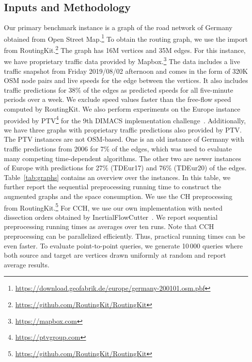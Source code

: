 \documentclass[manuscript,review]{acmart}
\begin{document}
\subsection{Inputs and Methodology}
Our primary benchmark instance is a graph of the road network of Germany obtained from Open Street Map.\footnote{\url{https://download.geofabrik.de/europe/germany-200101.osm.pbf}}
To obtain the routing graph, we use the import from RoutingKit.\footnote{\url{https://github.com/RoutingKit/RoutingKit}}
The graph has 16M vertices and 35M edges.
For this instance, we have proprietary traffic data provided by Mapbox.\footnote{\url{https://mapbox.com}}
The data includes a live traffic snapshot from Friday 2019/08/02 afternoon and comes in the form of 320K OSM node pairs and live speeds for the edge between the vertices.
It also includes traffic predictions for 38\% of the edges as predicted speeds for all five-minute periods over a week.
We exclude speed values faster than the free-flow speed computed by RoutingKit.
We also perform experiments on the Europe instance provided by PTV\footnote{\url{https://ptvgroup.com}} for the 9th DIMACS implementation challenge~\cite{DemetrescuGJ09}.
Additionally, we have three graphs with proprietary traffic predictions also provided by PTV.
The PTV instances are not OSM-based.
One is an old instance of Germany with traffic predictions from 2006 for 7\% of the edges, which was used to evaluate many competing time-dependent algorithms.
The other two are newer instances of Europe with predictions for 27\% (TDEur17) and 76\% (TDEur20) of the edges.
Table~\ref{tab:graphs} contains an overview over the instances.
In this table, we further report the sequential preprocessing running time to construct the augmented graphs and the space consumption.
We use the CH preprocessing from RoutingKit.\footnote{\url{https://github.com/RoutingKit/RoutingKit}}
For CCH, we use our own implementation with nested dissection orders obtained by InertialFlowCutter~\cite{GottesburenHUW19}.
We report sequential preprocessing running times as averages over ten runs.
Note that CCH preprocessing can be parallelized efficiently.
Thus, practical running times can be even faster.
To evaluate point-to-point queries, we generate 10\,000 queries where both source and target are vertices drawn uniformly at random and report average results.

\begin{table}
\centering
\caption{
Instances used in the evaluation with sequential preprocessing running times to construct (C)CH-Potentials.
With CCH-Potentials, $w_{\ell}$ can be updated by rerunning Phase 2.
}\label{tab:graphs}

\end{table}
\end{document}
